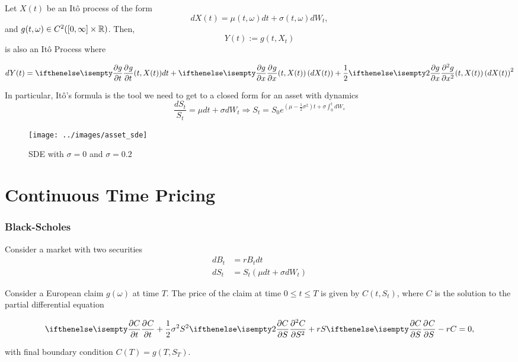 \documentclass{beamer}
\begin{document}
\begin{frame}
\begin{theorem}\label{th:itos_formula}
	Let $X(t)$ be an It\^o process of the form
	\[
		dX(t) = \mu(t, \omega) dt + \sigma(t, \omega) dW_t,
	\]
	and $g(t, \omega) \in C^2([0, \infty]\times\mathbb{R})$. Then,
	\begin{equation*}
		Y(t) := g(t, X_t)
	\end{equation*}
	is also an It\^o Process where
	
	\begin{equation*}
		dY(t) = \partialwrt{g}{t}(t, X(t)) dt + \partialwrt{g}{x}(t, X(t)) \left(dX(t)\right) + \frac{1}{2}\partialwrt[2]{g}{x} (t, X(t)) \left(dX(t)\right)^2
	\end{equation*}	
\end{theorem}	
\end{frame}

\begin{frame}
In particular, It\^o's formula is the tool we need to get to a closed form for an asset with dynamics
	\[
	\frac{dS_t}{S_t} = \mu dt + \sigma dW_t \Rightarrow S_t = S_0e^{\left(\mu - \frac{1}{2}\sigma^2\right) t + \sigma\int_0^t dW_s}
	\]
	
\begin{figure}[hbt]
  \texttt{[image: ../images/asset\_sde]}
  \caption{SDE with $\sigma=0$ and $\sigma=0.2$}
\end{figure}
\end{frame}

\section{Continuous Time Pricing}
\begin{frame}
	\frametitle{Black-Scholes}
	Consider a market with two securities
	\begin{align*}
	dB_t &= r B_t dt \\
	dS_t &= S_t(\mu dt + \sigma dW_t)
	\end{align*}
	
\begin{theorem}
	Consider a European claim $g(\omega)$ at time $T$. The price of the claim at time $0\leq t\leq T$ is given by $C(t,S_t)$, where $C$ is the solution to the partial differential equation
	
	\begin{equation}\label{eq:black-scholes-formula}
		\partialwrt{C}{t} + \frac{1}{2}\sigma^2S^2\partialwrt[2]{C}{S} + rS\partialwrt{C}{S} - rC = 0,
	\end{equation}

with final boundary condition $C(T) = g(T, S_T)$.
\end{theorem}
\end{frame}
\end{document}
